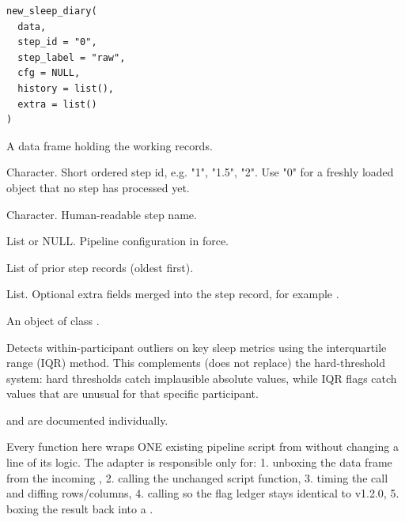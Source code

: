 \documentclass[a4paper]{book}
\begin{document}
%
\begin{Usage}
\begin{verbatim}
new_sleep_diary(
  data,
  step_id = "0",
  step_label = "raw",
  cfg = NULL,
  history = list(),
  extra = list()
)
\end{verbatim}
\end{Usage}
%
\begin{Arguments}
\begin{ldescription}
\item[\code{data}] A data frame holding the working records.

\item[\code{step\_id}] Character. Short ordered step id, e.g. "1", "1.5", "2".
Use "0" for a freshly loaded object that no step has processed yet.

\item[\code{step\_label}] Character. Human-readable step name.

\item[\code{cfg}] List or NULL. Pipeline configuration in force.

\item[\code{history}] List of prior step records (oldest first).

\item[\code{extra}] List. Optional extra fields merged into the step record,
for example .
\end{ldescription}
\end{Arguments}
%
\begin{Value}
An object of class .
\end{Value}
%
\begin{Description}
Detects within-participant outliers on key sleep metrics using the
interquartile range (IQR) method.  This complements (does not replace)
the hard-threshold system: hard thresholds catch implausible absolute
values, while IQR flags catch values that are unusual for that
specific participant.
\end{Description}
%
\begin{Details}
 and 
are documented individually.
\end{Details}
%
\begin{Description}
Every function here wraps ONE existing pipeline script from 
without changing a line of its logic. The adapter is responsible only for:
1. unboxing the data frame from the incoming ,
2. calling the unchanged script function,
3. timing the call and diffing rows/columns,
4. calling  so the flag ledger stays identical to v1.2.0,
5. boxing the result back into a .
\end{Description}
\end{document}

